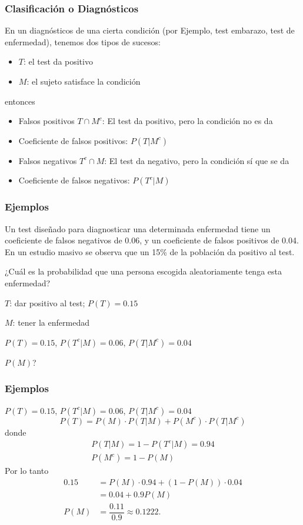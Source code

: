 \documentclass[handout]{beamer}\usepackage[]{graphicx}\usepackage[]{color}
\renewcommand{\emph}[1]{{\color{red}#1}}
\theoremstyle{plain}
\theoremstyle{definition}
\begin{document}
\begin{frame}
\frametitle{Clasificación o Diagnósticos}
En un diagnósticos de una  cierta  condición (por Ejemplo, test embarazo, test de enfermedad), tenemos dos tipos de sucesos:
\begin{itemize}
\item $T$: el test da positivo
\item $M$: el sujeto satisface la condición
\end{itemize}
entonces
\begin{itemize}
\item \emph{Falsos positivos} $T\cap M^c$: El test da positivo, pero la condición no es da
\item \emph{Coeficiente de falsos positivos:} $P(T|M^c)$
\item \emph{Falsos negativos} $T^c\cap M$: El test da negativo, pero la condición sí que se da
\item \emph{Coeficiente de falsos negativos:} $P(T^c|M)$
\end{itemize}
\end{frame}



\begin{frame}
\frametitle{Ejemplos}

Un test diseñado para diagnosticar una determinada enfermedad tiene un coeficiente de falsos negativos de 0.06, y un coeficiente de falsos positivos de 0.04. En un estudio masivo se observa que un 15\% de la población da positivo al test.

¿Cuál es la probabilidad que una persona escogida aleatoriamente  tenga esta enfermedad?
\medskip

$T$: dar positivo al test; $P(T)=0.15$
\medskip

$M$: tener la enfermedad\medskip

$P(T)=0.15$, $P(T^c|M)=0.06$, $P(T|M^c)=0.04$\medskip

 $P(M)$?
\end{frame}


\begin{frame}
\frametitle{Ejemplos}
\vspace*{-2ex}

$P(T)=0.15$, $P(T^c|M)=0.06$, $P(T|M^c)=0.04$
$$
P(T) =P(M)\cdot P(T|M)+P(M^c)\cdot P(T|M^c)
$$
donde
$$
\begin{array}{l}
P(T|M)=1-P(T^c|M)=0.94 \\[1ex]
P(M^c)=1-P(M)
\end{array}
$$
 Por lo tanto
 $$
\begin{array}{rl}
0.15 & = P(M)\cdot 0.94+(1-P(M))\cdot 0.04\\
 & =0.04+0.9P(M)\\[1ex]
P(M) & =\dfrac{0.11}{0.9}\approx 0.1222.
\end{array}
$$

\end{frame}
\end{document}
